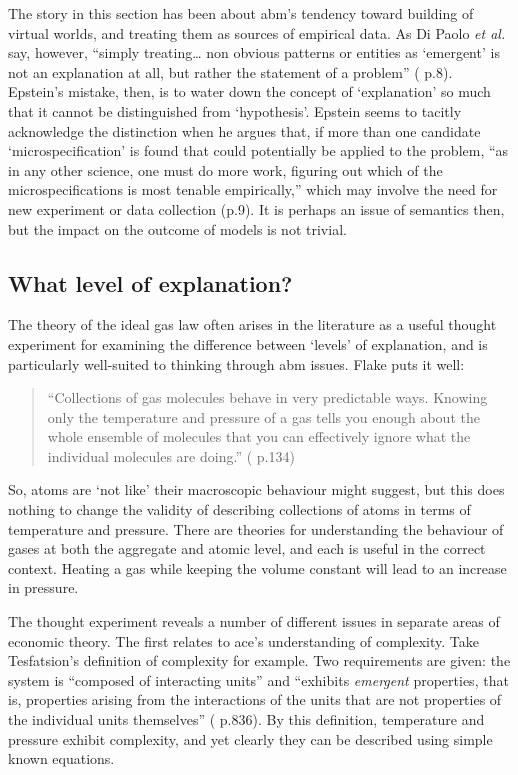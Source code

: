 The story in this section has been about \gls{abm}'s tendency toward building of virtual worlds, and treating them as sources of empirical data. As Di Paolo \emph{et al.} say, however, ``simply treating… non obvious patterns or entities as `emergent' is not an explanation at all, but rather the statement of a problem'' (\citealt{di_paolo_simulation_2000} p.8). Epstein's mistake, then, is to water down the concept of `explanation' so much that it cannot be distinguished from `hypothesis'. Epstein seems to tacitly acknowledge the distinction when he argues that, if more than one candidate `microspecification' is found that could potentially be applied to the problem, ``as in any other science, one must do more work, figuring out which of the microspecifications is most tenable empirically,'' which may involve the need for new experiment or data collection (p.9). It is perhaps an issue of semantics then, but the impact on the outcome of models is not trivial. 

\subsection{What level of explanation? \label{sec:levels}}

The theory of the ideal gas law often arises in the literature as a useful thought experiment for examining the difference between `levels' of explanation, and is particularly well-suited to thinking through \gls{abm} issues. Flake puts it well:

\begin{quote}
``Collections of gas molecules behave in very predictable ways. Knowing only the temperature and pressure of a gas tells you enough about the whole ensemble of molecules that you can effectively ignore what the individual molecules are doing.'' (\citealt{flake_computational_1998} p.134)
\end{quote}

So, atoms are `not like' their macroscopic behaviour might suggest, but this does nothing to change the validity of describing collections of atoms in terms of temperature and pressure. There are theories for understanding the behaviour of gases at both the aggregate and atomic level, and each is useful in the correct context. Heating a gas while keeping the volume constant will lead to an increase in pressure. 

The thought experiment reveals a number of different issues in separate areas of economic theory. The first relates to \gls{ace}'s understanding of complexity. Take Tesfatsion's definition of complexity for example. Two requirements are given: the system is ``composed of interacting units'' and ``exhibits \emph{emergent} properties, that is, properties arising from the interactions of the units that are not properties of the individual units themselves'' (\citealt{tesfatsion_agent-based_2006} p.836). By this definition, temperature and pressure exhibit complexity, and yet clearly they can be described using simple known equations.

